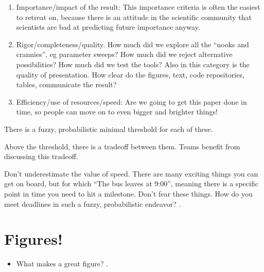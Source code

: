 \documentclass[letterpaper,10pt,english]{sphinxmanual}
\let\sphinxpxdimen\pdfpxdimen\else\newdimen\sphinxpxdimen
\begin{document}
\noindent\sphinxincludegraphics[width=400\sphinxpxdimen]{{fig3way_2}.pdf}
\begin{enumerate}
%
\item {} 
\sphinxAtStartPar
Importance/impact of the result: This importance criteria is often the easiest to retreat on, because there is an attitude in the scientific community that scientists are bad at predicting future importance anyway.

\item {} 
\sphinxAtStartPar
Rigor/completeness/quality. How much did we explore all the “nooks and crannies”, eg parameter sweeps? How much did we reject alternative possibilities? How much did we test the tools? Also in this category is the quality of presentation. How clear do the figures, text, code repositories, tables, communicate the result?

\item {} 
\sphinxAtStartPar
Efficiency/use of resources/speed: Are we going to get this paper done in time, so people can move on to even bigger and brighter things!

\end{enumerate}

\sphinxAtStartPar
There is a fuzzy, probabilistic minimal threshold for each of these.

\sphinxAtStartPar
Above the threshold, there is a trade\sphinxhyphen{}off between them. Teams benefit from discussing this trade\sphinxhyphen{}off.

\sphinxAtStartPar
Don’t underestimate the value of speed. There are many exciting things you can get on board, but for which “The bus leaves at 9:00”, meaning there is a specific point in time you need to hit a milestone. Don’t fear these things. How do you meet deadlines in such a fuzzy, probabilistic endeavor? {\hyperref[\detokenize{03CodersAtWork:codersatwork}]{}}.


\section{Figures!}
\label{\detokenize{02Elements:figures}}\begin{itemize}
\item {} 
\sphinxAtStartPar
What makes a great figure? .

\end{itemize}
\end{document}

